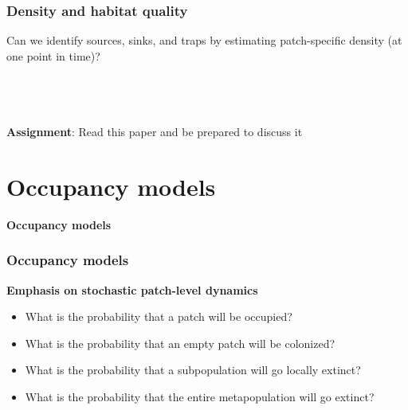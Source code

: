 \documentclass[color=usenames,dvipsnames]{beamer}\usepackage[]{graphicx}\usepackage[]{color}
\begin{document}
\begin{frame}
  \frametitle{Density and habitat quality}
  Can we identify sources, sinks, and traps by estimating
  patch-specific density (at one point in time)? \\
  \pause
  \vfill
  \begin{columns}
    \wide
    \centering
     \\
  \end{columns}
  \pause
  \vfill
  \centering
  \large
  \alert{\bf Assignment}: Read this paper and be prepared to discuss it \\
\end{frame}




\section{Occupancy models}


\begin{frame}[plain]
  \Huge
  \centering
  \vfill
  \bf 
  \color{MidnightBlue}
  Occupancy models \\
  \vfill
\end{frame}


\begin{frame}[fragile]
  \frametitle{Occupancy models}
  \large
  {\bf Emphasis on stochastic patch-level dynamics}
  \begin{itemize}[<+->]
    \item What is the probability that a patch will be occupied?
    \item What is the probability that an empty patch will be colonized?
    \item What is the probability that a subpopulation will go locally extinct?
    \item What is the probability that the entire metapopulation will
      go extinct?
  \end{itemize}
\end{frame}
\end{document}
